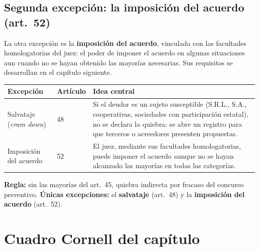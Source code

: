 \documentclass[12pt,oneside]{book}
\begin{document}
\subsection{Segunda excepción: la imposición del acuerdo (art.\ 52)}

La otra excepción es la \textbf{imposición del acuerdo}, vinculada con las facultades homologatorias del juez: el poder de imponer el acuerdo en algunas situaciones aun cuando no se hayan obtenido las mayorías necesarias. Sus requisitos se desarrollan en el capítulo siguiente.

\begin{center}
\small
\begin{tabularx}{\textwidth}{P{2.8cm} P{1.6cm} Y}
\toprule
\textbf{Excepción} & \textbf{Artículo} & \textbf{Idea central} \\
\midrule
Salvataje (\emph{cram down}) & 48 & Si el deudor es un sujeto susceptible (S.R.L., S.A., cooperativas, sociedades con participación estatal), no se declara la quiebra: se abre un registro para que terceros o acreedores presenten propuestas. \\
Imposición del acuerdo & 52 & El juez, mediante sus facultades homologatorias, puede imponer el acuerdo aunque no se hayan alcanzado las mayorías en todas las categorías. \\
\bottomrule
\end{tabularx}
\end{center}

\begin{important}
\textbf{Regla:} sin las mayorías del art.\ 45, quiebra indirecta por fracaso del concurso preventivo. \textbf{Únicas excepciones:} el \textbf{salvataje} (art.\ 48) y la \textbf{imposición del acuerdo} (art.\ 52).
\end{important}

\section{Cuadro Cornell del capítulo}
\end{document}
